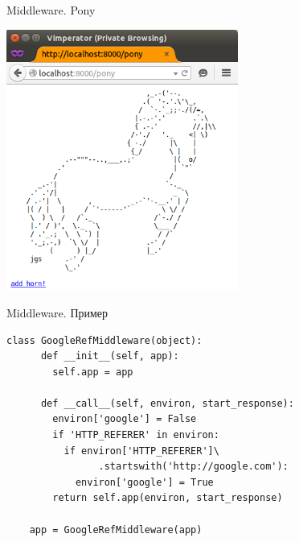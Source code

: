 \begin{frame}{Middleware. Pony}
    \begin{center}
        \includegraphics[width=3in]{media/wsgi_example_pony.png}
    \end{center}
\end{frame}

\begin{frame}[fragile]{Middleware. Пример}
    \begin{lstlisting}[style=python]
    class GoogleRefMiddleware(object):
      def __init__(self, app):
        self.app = app

      def __call__(self, environ, start_response):
        environ['google'] = False
        if 'HTTP_REFERER' in environ:
          if environ['HTTP_REFERER']\
                .startswith('http://google.com'):
            environ['google'] = True
        return self.app(environ, start_response)

    app = GoogleRefMiddleware(app)
    \end{lstlisting}
\end{frame}


